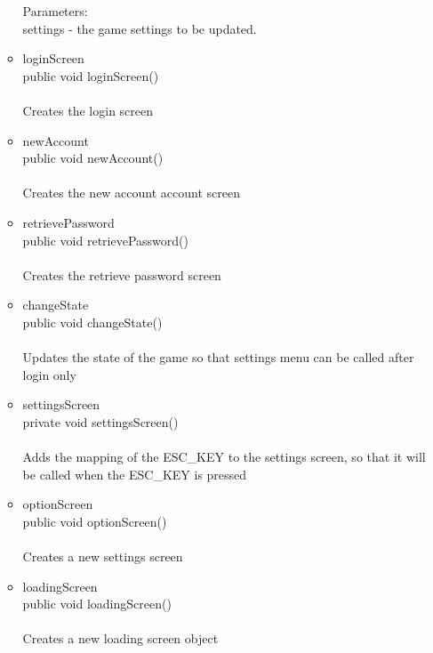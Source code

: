 \documentclass[letterpaper]{article}
\begin{document}
\begin{itemize}
\begin{itemize}
Parameters: \\
    settings - the game settings to be updated.  \\



\item	loginScreen \\
													public void loginScreen() \\ \\
													Creates the login screen \\	
											\item	newAccount \\
													public void newAccount() \\ \\ 
													Creates the new account account screen \\
											\item	retrievePassword \\
													public void retrievePassword() \\ \\
													Creates the retrieve password screen \\
											\item	changeState \\
													public void changeState() \\ \\
													Updates the state of the game so that settings menu can be called after login only \\
											\item	settingsScreen \\
													private void settingsScreen() \\ \\
													Adds the mapping of the ESC\_KEY to the settings screen, so that it will be called when the ESC\_KEY is pressed \\
											\item	optionScreen \\
													public void optionScreen() \\ \\
													Creates a new settings screen \\
											\item	loadingScreen \\
													public void loadingScreen() \\ \\
													Creates a new loading screen object

\end{itemize}
\end{itemize}
\end{document}
